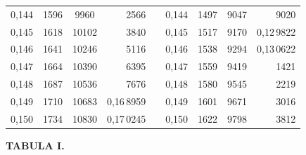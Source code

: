 \begin{tabular}{|c|c|c|r|@{}p{9pt}@{}|c|c|c|r|}
0,144 & 1596 & 9960 & 2566 &  & 0,144 & 1497 & 9047 & 9020 \\
0,145 & 1618 & 10102 & 3840 &  & 0,145 & 1517 & 9170 & 0,12\,9822 \\[3pt]
0,146 & 1641 & 10246 & 5116 &  & 0,146 & 1538 & 9294 & 0,13\,0622 \\
0,147 & 1664 & 10390 & 6395 &  & 0,147 & 1559 & 9419 & 1421 \\
0,148 & 1687 & 10536 & 7676 &  & 0,148 & 1580 & 9545 & 2219 \\
0,149 & 1710 & 10683 & 0,16\,8959 &  & 0,149 & 1601 & 9671 & 3016 \\
0,150 & 1734 & 10830 & 0,17\,0245 &  & 0,150 & 1622 & 9798 & 3812 \\
\hline
\end{tabular}\par
\endgroup
\clearpage
{}
\begingroup
\centering
\fontsize{9}{9}\selectfont
\setlength{\tabcolsep}{6pt}
\renewcommand{\arraystretch}{1}
\setlength{\parskip}{0pt}
\textbf{TABULA I.}
\par\vspace{7pt}
